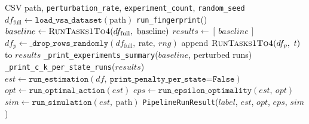 \documentclass[11pt,a4paper]{article}
\begin{document}
\begin{algorithm}[htbp]
  \caption{General flow (\texttt{main.run\_all})}
  \label{alg:flow}
  \begin{algorithmic}[1]
    \Require CSV path, \texttt{perturbation\_rate}, \texttt{experiment\_count},
             \texttt{random\_seed}
    \State $df_{\mathrm{full}} \gets \texttt{load\_vsa\_dataset}(\text{path})$
    \State \texttt{run\_fingerprint}()
    \State $baseline \gets \textsc{RunTasks1To4}(df_{\mathrm{full}},\ \text{baseline})$
    \State $results \gets [\,baseline\,]$
        \State $df_p \gets \texttt{\_drop\_rows\_randomly}(df_{\mathrm{full}},\ \text{rate},\ rng)$
        \State append $\textsc{RunTasks1To4}(df_p,\ t)$ to $results$
      \EndFor
      \State \texttt{\_print\_experiments\_summary}($baseline$, perturbed runs)
    \EndIf
    \State \texttt{\_print\_c\_k\_per\_state\_runs}($results$)
    \Statex
      \State $est \gets \texttt{run\_estimation}(df,\ \texttt{print\_penalty\_per\_state=False})$
      \State $opt \gets \texttt{run\_optimal\_action}(est)$
      \State $eps \gets \texttt{run\_epsilon\_optimality}(est,\ opt)$
      \State $sim \gets \texttt{run\_simulation}(est,\ \text{path})$
      \State \Return \texttt{PipelineRunResult}($label$, $est$, $opt$, $eps$, $sim$)
    \EndFunction
  \end{algorithmic}
\end{algorithm}
\end{document}
